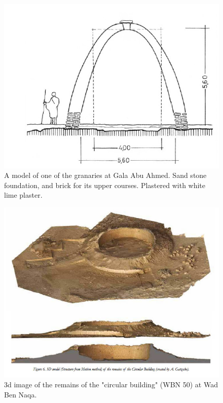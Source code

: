 \documentclass[a4paper,12pt]{scrreprt}
\begin{document}
\begin{figure}[H]
	\centering
	\includegraphics[width=\textwidth]{img/farmstead/sketch_granaries_gala_abu_ahmed}
	\caption{A model of one of the granaries at Gala Abu Ahmed. Sand stone foundation, and brick for its upper courses. Plastered with white lime plaster.}
\end{figure}

\begin{figure}[H]
	\centering
	\includegraphics[width=\textwidth]{img/farmstead/3d_reconstruction_circular_building}
	\caption{3d image of the remains of the "circular building" (WBN 50) at Wad Ben Naqa.}
\end{figure}
\end{document}
